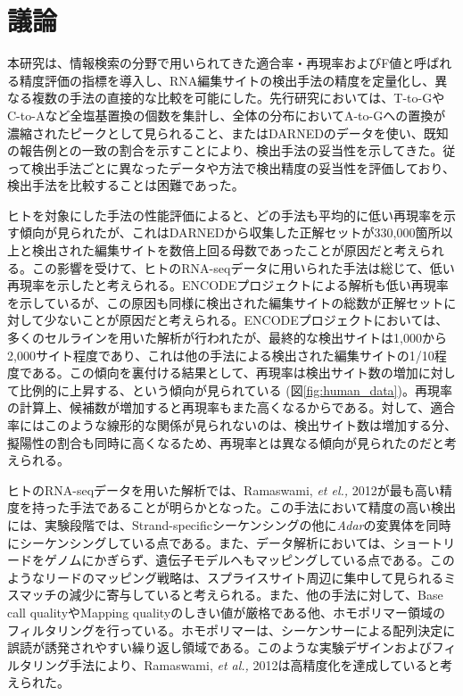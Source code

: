 \section{議論}
本研究は、情報検索の分野で用いられてきた適合率・再現率およびF値と呼ばれる精度評価の指標を導入し、RNA編集サイトの検出手法の精度を定量化し、異なる複数の手法の直接的な比較を可能にした。先行研究においては、T-to-GやC-to-Aなど全塩基置換の個数を集計し、全体の分布においてA-to-Gへの置換が濃縮されたピークとして見られること、またはDARNEDのデータを使い、既知の報告例との一致の割合を示すことにより、検出手法の妥当性を示してきた。従って検出手法ごとに異なったデータや方法で検出精度の妥当性を評価しており、検出手法を比較することは困難であった。
\par
ヒトを対象にした手法の性能評価によると、どの手法も平均的に低い再現率を示す傾向が見られたが、これはDARNEDから収集した正解セットが330,000箇所以上と検出された編集サイトを数倍上回る母数であったことが原因だと考えられる。この影響を受けて、ヒトのRNA-seqデータに用いられた手法は総じて、低い再現率を示したと考えられる。ENCODEプロジェクトによる解析も低い再現率を示しているが、この原因も同様に検出された編集サイトの総数が正解セットに対して少ないことが原因だと考えられる。ENCODEプロジェクトにおいては、多くのセルラインを用いた解析が行われたが、最終的な検出サイトは1,000から2,000サイト程度であり、これは他の手法による検出された編集サイトの1/10程度である。この傾向を裏付ける結果として、再現率は検出サイト数の増加に対して比例的に上昇する、という傾向が見られている (図\ref{fig:human_data})。再現率の計算上、候補数が増加すると再現率もまた高くなるからである。対して、適合率にはこのような線形的な関係が見られないのは、検出サイト数は増加する分、擬陽性の割合も同時に高くなるため、再現率とは異なる傾向が見られたのだと考えられる。
\par
ヒトのRNA-seqデータを用いた解析では、Ramaswami, \textit{et el., }2012が最も高い精度を持った手法であることが明らかとなった。この手法において精度の高い検出には、実験段階では、Strand-specificシーケンシングの他に\textit{Adar}の変異体を同時にシーケンシングしている点である。また、データ解析においては、ショートリードをゲノムにかぎらず、遺伝子モデルへもマッピングしている点である。このようなリードのマッピング戦略は、スプライスサイト周辺に集中して見られるミスマッチの減少に寄与していると考えられる。また、他の手法に対して、Base call qualityやMapping qualityのしきい値が厳格である他、ホモポリマー領域のフィルタリングを行っている。ホモポリマーは、シーケンサーによる配列決定に誤読が誘発されやすい繰り返し領域である。このような実験デザインおよびフィルタリング手法により、Ramaswami, \textit{et al., }2012は高精度化を達成していると考えられた。
